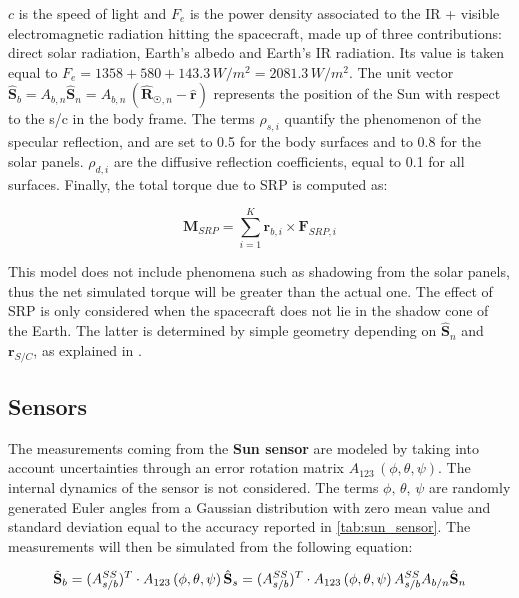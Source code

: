 $c$ is the speed of light and $F_e$ is the power density associated to the IR + visible electromagnetic radiation hitting the spacecraft, made up of three contributions: direct solar radiation, Earth's albedo and Earth's IR radiation. Its value is taken equal to $F_e = 1358 + 580 + 143.3 \, W/m^2 = 2081.3 \, W/m^2$. The unit vector $\hat{\mathbf{S}}_b = A_{b,n} \hat{\mathbf{S}}_n = A_{b,n} \,(\hat{\mathbf{R}}_{\Sun,n} - \hat{\mathbf{r}}) $ represents the position of the Sun with respect to the s/c in the body frame. The terms $\rho_{s,i}$ quantify the phenomenon of the specular reflection, and are set to 0.5 for the body surfaces and to 0.8 for the solar panels. $\rho_{d,i}$ are the diffusive reflection coefficients, equal to 0.1 for all surfaces. Finally, the total torque due to SRP is computed as:

\begin{equation}
    \mathbf{M}_{SRP} = \sum_{i=1}^K \mathbf{r}_{b,i} \times \mathbf{F}_{SRP,i}
\end{equation}

This model does not include phenomena such as shadowing from the solar panels, thus the net simulated torque will be greater than the actual one. The effect of SRP is only considered when the spacecraft does not lie in the shadow cone of the Earth. The latter is determined by simple geometry depending on $\hat{\mathbf{S}}_n$ and $\mathbf{r}_{S/C}$, as explained in \cite{curtis}.

\subsection{Sensors}

The measurements coming from the \textbf{Sun sensor} are modeled by taking into account uncertainties through an error rotation matrix $A_{123}\,(\phi, \theta, \psi)$. The internal dynamics of the sensor is not considered. The terms $\phi,\,\theta,\,\psi$ are randomly generated Euler angles from a Gaussian distribution with zero mean value and standard deviation equal to the accuracy reported in \cref{tab:sun_sensor}. The measurements will then be simulated from the following equation:

\begin{equation}
    \Tilde{\mathbf{S}}_b = (A_{s/b}^{SS})^T \cdot A_{123}\,(\phi,\theta,\psi)\, \hat{\mathbf{S}}_s = (A_{s/b}^{SS})^T \cdot A_{123}\,(\phi,\theta,\psi)\, A_{s/b}^{SS} A_{b/n} \hat{\mathbf{S}}_n
\end{equation}

